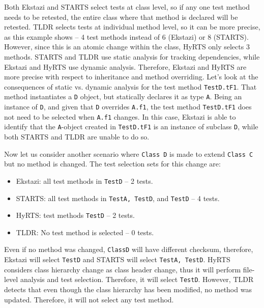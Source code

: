 Both Ekstazi and STARTS select tests at class level, so if any one test method needs to be retested, the entire class where that method is declared will be retested. TLDR selects tests at individual method level, so it can be more precise, as this example shows -- 4 test methods instead of 6 (Ekstazi) or 8 (STARTS). However, since this is an atomic change within the class, HyRTS only selects 3 methods. STARTS and TLDR use static analysis for tracking dependencies, while Ekstazi and HyRTS use dynamic analysis. Therefore, Ekstazi and HyRTS are more precise with respect to inheritance and method overriding. Let's look at the consequences of static vs. dynamic analysis for the test method \texttt{TestD.tF1}. That method instantiates a \texttt{D} object, but statically declares it as type \texttt{A}. Being an instance of \texttt{D}, and given that \texttt{D} overrides \texttt{A.f1}, the test method \texttt{TestD.tF1} does not need to be selected when \texttt{A.f1} changes. In this case, Ekstazi is able to identify that the \texttt{A}-object created in \texttt{TestD.tF1} is an instance of subclass \texttt{D}, while both STARTS and TLDR are unable to do so. 

Now let us consider another scenario where \texttt{Class D} is made to extend \texttt{Class C} but no method is changed. The test selection sets for this change are: 
\begin{itemize}
	\item Ekstazi: all test methods in \texttt{TestD} -- 2 tests.
	
	\item STARTS: all test methods in \texttt{TestA, TestD}, and \texttt{TestD} -- 4 tests.
	
	\item HyRTS: test methods \texttt{TestD} -- 2 tests.
	
	\item TLDR: No test method is selected -- 0 tests.
\end{itemize}

Even if no method was changed, \texttt{ClassD} will have different checksum, therefore, Ekstazi will select \texttt{TestD} and STARTS will select \texttt{TestA, TestD}. HyRTS considers class hierarchy change as class header change, thus it will perform file-level analysis and test selection. Therefore, it will select \texttt{TestD}. However, TLDR detects that even though the class hierarchy has been modified, no method was updated. Therefore, it will not select any test method. 